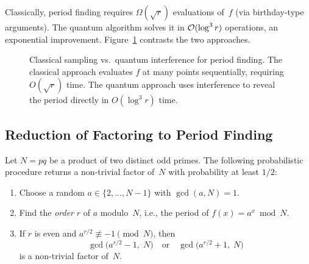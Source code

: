 Classically, period finding requires $\Omega(\sqrt{r})$ evaluations of~$f$ (via birthday-type arguments).  The quantum algorithm solves it in $\mathcal{O}(\log^3 r)$ operations, an exponential improvement.  Figure~\ref{fig:ch04-period-finding} contrasts the two approaches.

\begin{figure}[t]
\centering
{}
\caption{Classical sampling vs.\ quantum interference for period finding.  The classical approach evaluates $f$ at many points sequentially, requiring $O(\sqrt{r})$ time.  The quantum approach uses interference to reveal the period directly in $O(\log^3 r)$ time.}
\label{fig:ch04-period-finding}
\end{figure}


\subsection{Reduction of Factoring to Period Finding}
\label{subsec:factoring-reduction}

\begin{theorem}
\label{thm:factoring-reduction}
Let $N = pq$ be a product of two distinct odd primes.  The following probabilistic procedure returns a non-trivial factor of~$N$ with probability at least $1/2$:
\begin{enumerate}
\item Choose a random $a \in \{2, \ldots, N-1\}$ with $\gcd(a, N) = 1$.
\item Find the \emph{order} $r$ of $a$ modulo~$N$, i.e., the period of $f(x) = a^x \bmod N$.
\item If $r$ is even and $a^{r/2} \not\equiv -1 \pmod{N}$, then
\begin{equation}
\label{eq:factor-extraction}
\gcd\bigl(a^{r/2} - 1,\; N\bigr) \quad\text{or}\quad \gcd\bigl(a^{r/2} + 1,\; N\bigr)
\end{equation}
is a non-trivial factor of~$N$.
\end{enumerate}
\end{theorem}

